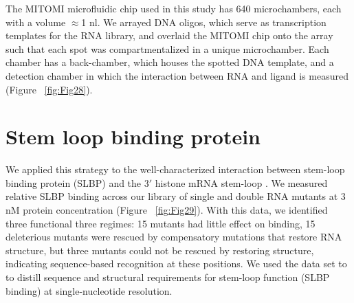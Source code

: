 The MITOMI microfluidic chip used in this study has 640 microchambers, each with a volume $\approx$1 nl. We arrayed DNA oligos, which serve as transcription templates for the RNA library, and overlaid the MITOMI chip onto the array such that each spot was compartmentalized in a unique microchamber. Each chamber has a back-chamber, which houses the spotted DNA template, and a detection chamber in which the interaction between RNA and ligand is measured (Figure ~\ref{fig:Fig28}).

\section{Stem loop binding protein}

We applied this strategy to the well-characterized interaction between stem-loop binding protein (SLBP) and the 3$'$ histone mRNA stem-loop \cite{Marzluff:2008fy}. We measured relative SLBP binding across our library of single and double RNA mutants at 3 nM protein concentration (Figure ~\ref{fig:Fig29}). With this data, we identified three functional three regimes: 15 mutants had little effect on binding, 15 deleterious mutants were rescued by compensatory mutations that restore RNA structure, but three mutants could not be rescued by restoring structure, indicating sequence-based recognition at these positions. We used the data set to to distill sequence and structural requirements for stem-loop function (SLBP binding) at single-nucleotide resolution.

